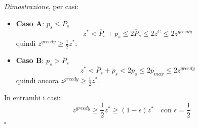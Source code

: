 \textit{Dimostrazione}, per casi:
\begin{itemize}
	\item \textbf{Caso A}: $p_s\le \overline{P}_s$
	\begin{equation*}
		z^*<\overline{P}_s+p_s\le 2\overline{P}_s\le 2z^C\le 2z^{greedy}
	\end{equation*}
	quindi $z^{greedy}\ge \frac{1}{2}z^*$;
	\item \textbf{Caso B}: $p_s>\overline{P}_s$
	\begin{equation*}
		z^*<\overline{P}_s+p_s<2p_s\le 2p_{max}\le 2z^{greedy}
	\end{equation*}
	quindi ancora $z^{greedy}\ge \frac{1}{2}z^*$.
\end{itemize}
In entrambi i casi:
\begin{equation*}
	z^{greedy}\ge \frac{1}{2}z^*\ge (1-\epsilon)z^*\quad \textrm{con } \epsilon=\frac{1}{2}
\end{equation*}
$\square$
